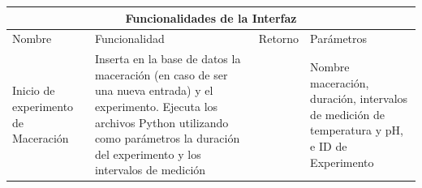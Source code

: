                 \begin{table}[h]
                \centering
                \begin{tabularx}{\textwidth}{|X|X|X|X|}
                    \hline
                    \multicolumn{4}{|c|}{\textbf{Funcionalidades de la Interfaz}} \\
                    \hline
                    Nombre & Funcionalidad & Retorno & Parámetros \\ 
                    \hline 
                    \hline
                    
                    Inicio de experimento de Maceración & Inserta en la base de datos la maceración (en caso de ser una nueva entrada) y el experimento. Ejecuta los archivos Python utilizando como parámetros la duración del experimento y los intervalos de medición & & Nombre maceración,  duración, intervalos de medición de temperatura y pH, e ID de Experimento \\ 
                    \hline
                \end{tabularx}
                \end{table}
                

